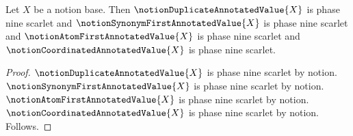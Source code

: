 \begin{proposition}\label{notion_deduplicated_results_available}
    Let $X$ be a notion base.
    Then $\notionDuplicateAnnotatedValue{X}$ is phase nine scarlet and
        $\notionSynonymFirstAnnotatedValue{X}$ is phase nine scarlet and
        $\notionAtomFirstAnnotatedValue{X}$ is phase nine scarlet and
        $\notionCoordinatedAnnotatedValue{X}$ is phase nine scarlet.
\end{proposition}
\begin{proof}
    $\notionDuplicateAnnotatedValue{X}$ is phase nine scarlet by notion.
    $\notionSynonymFirstAnnotatedValue{X}$ is phase nine scarlet by notion.
    $\notionAtomFirstAnnotatedValue{X}$ is phase nine scarlet by notion.
    $\notionCoordinatedAnnotatedValue{X}$ is phase nine scarlet by notion.
    Follows.
\end{proof}
